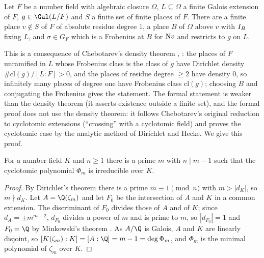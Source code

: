 \begin{theorem}\label{pf:sh-hodge:cheb}
Let $F$ be a number field with algebraic closure $\Omega$, $L\subseteq\Omega$ a finite Galois extension of $F$,
$g\in\Gal(L/F)$ and $S$ a finite set of finite places of $F$. There are a finite place $v\notin S$ of $F$ of absolute residue
degree $1$, a place $B$ of $\Omega$ above $v$ with $I_B$ fixing $L$, and $\sigma\in G_F$ which is a Frobenius at $B$ for
$\mathrm{N} v$ and restricts to $g$ on $L$.
\end{theorem}

\begin{remark}\label{pf:sh-hodge:chebrem}
This is a consequence of Chebotarev's density theorem \cite{Chebotarev1926}, \cite[Ch.~VII, Thm.~13.4]{Neukirch1999}: the
places of $F$ unramified in $L$ whose Frobenius class is the class of $g$ have Dirichlet density $\#\mathrm{cl}(g)/[L:F]>0$, and
the places of residue degree $\ge2$ have density $0$, so infinitely many places of degree one have Frobenius class
$\mathrm{cl}(g)$; choosing $B$ and conjugating the Frobenius gives the statement. The formal statement is weaker than the
density theorem (it asserts existence outside a finite set), and the formal proof does not use the density theorem: it
follows Chebotarev's original reduction to cyclotomic extensions (``crossing'' with a cyclotomic field) and proves the
cyclotomic case by the analytic method of Dirichlet and Hecke. We give this proof.
\end{remark}

\begin{lemma}\label{pf:sh-hodge:primem}
For a number field $K$ and $n\ge1$ there is a prime $m$ with $n\mid m-1$ such that the cyclotomic polynomial $\Phi_m$ is
irreducible over $K$.
\end{lemma}

\begin{proof}
By Dirichlet's theorem there is a prime $m\equiv1\pmod n$ with $m>|d_K|$, so $m\nmid d_K$. Let $A=\Q(\zeta_m)$ and let $F_0$ be
the intersection of $A$ and $K$ in a common extension. The discriminant of $F_0$ divides those of $A$ and of $K$; since
$d_A=\pm m^{m-2}$, $d_{F_0}$ divides a power of $m$ and is prime to $m$, so $|d_{F_0}|=1$ and $F_0=\Q$ by Minkowski's
theorem \cite[Ch.~III, Thm.~2.17]{Neukirch1999}. As $A/\Q$ is Galois, $A$ and $K$ are linearly disjoint, so $[K(\zeta_m):K]=
[A:\Q]=m-1=\deg\Phi_m$, and $\Phi_m$ is the minimal polynomial of $\zeta_m$ over $K$.
\end{proof}


